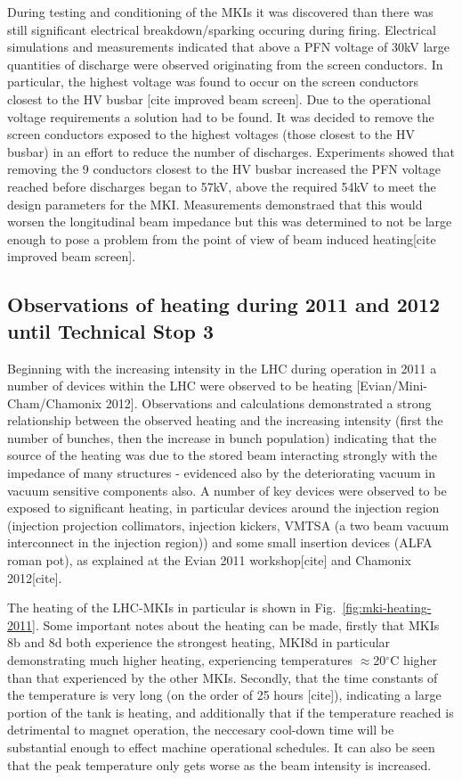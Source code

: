 During testing and conditioning of the MKIs it was discovered than there was still significant electrical breakdown/sparking occuring during firing. Electrical simulations and measurements indicated that above a PFN voltage of 30kV large quantities of discharge were observed originating from the screen conductors. In particular, the highest voltage was found to occur on the screen conductors closest to the HV busbar [cite improved beam screen]. Due to the operational voltage requirements a solution had to be found. It was decided to remove the screen conductors exposed to the highest voltages (those closest to the HV busbar) in an effort to reduce the number of discharges. Experiments showed that removing the 9 conductors closest to the HV busbar increased the PFN voltage reached before discharges began to 57kV, above the required 54kV to meet the design parameters for the MKI. Measurements demonstraed that this would worsen the longitudinal beam impedance but this was determined to not be large enough to pose a problem from the point of view of beam induced heating[cite improved beam screen].

\subsection{Observations of heating during 2011 and 2012 until Technical Stop 3}

Beginning with the increasing intensity in the LHC during operation in 2011 a number of devices within the LHC were observed to be heating [Evian/Mini-Cham/Chamonix 2012]. Observations and calculations demonstrated a strong relationship between the observed heating and the increasing intensity (first the number of bunches, then the increase in bunch population) indicating that the source of the heating was due to the stored beam interacting strongly with the impedance of many structures - evidenced also by the deteriorating vacuum in vacuum sensitive components also. A number of key devices were observed to be exposed to significant heating, in particular devices around the injection region (injection projection collimators, injection kickers, VMTSA (a two beam vacuum interconnect in the injection region)) and some small insertion devices (ALFA roman pot), as explained at the Evian 2011 workshop[cite] and Chamonix 2012[cite]. 

The heating of the LHC-MKIs in particular is shown in Fig.~\ref{fig:mki-heating-2011}. Some important notes about the heating can be made, firstly that MKIs 8b and 8d both experience the strongest heating, MKI8d in particular demonstrating much higher heating, experiencing temperatures $\approx$20$^{\circ}$C higher than that experienced by the other MKIs. Secondly, that the time constants of the temperature is very long (on the order of 25 hours [cite]), indicating a large portion of the tank is heating, and additionally that if the temperature reached is detrimental to magnet operation, the neccesary cool-down time will be substantial enough to effect machine operational schedules. It can also be seen that the peak temperature only gets worse as the beam intensity is increased.

